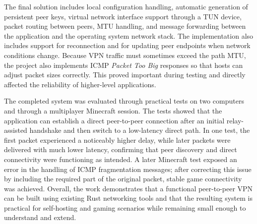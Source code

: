 \documentclass[a4paper, 10pt]{article}
\begin{document}
The final solution includes local configuration handling, automatic generation of persistent peer keys,
virtual network interface support through a TUN device, packet routing between peers, MTU handling, and message forwarding between
the application and the operating system network stack. The implementation also includes support for reconnection and for updating peer endpoints when network conditions change.
Because VPN traffic must sometimes exceed the path MTU, the project also implements ICMP \emph{Packet Too Big} responses so that hosts can adjust packet sizes correctly.
This proved important during testing and directly affected the reliability of higher-level applications.

The completed system was evaluated through practical tests on two computers and through a multiplayer Minecraft session.
The tests showed that the application can establish a direct peer-to-peer connection after an initial relay-assisted handshake and then switch to a low-latency direct path.
In one test, the first packet experienced a noticeably higher delay, while later packets were delivered with much lower latency,
confirming that peer discovery and direct connectivity were functioning as intended.
A later Minecraft test exposed an error in the handling of ICMP fragmentation messages; after correcting this issue by including the required part of the original packet, stable game connectivity was achieved.
Overall, the work demonstrates that a functional peer-to-peer VPN can be built using existing Rust networking tools and that
the resulting system is practical for self-hosting and gaming scenarios while remaining small enough to understand and extend.
\end{document}
